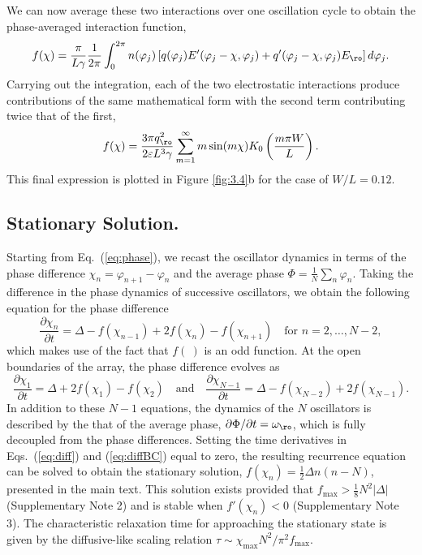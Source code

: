 We can now average these two interactions over one oscillation cycle to obtain the phase-averaged interaction function,
\begin{equation}
    f(\chi) = \frac{\pi}{L\gamma}\frac{1}{2 \pi}\int_0^{2\pi} n(\varphi_j) \left[ q(\varphi_j) E'(\varphi_j-\chi,\varphi_j) + q'(\varphi_j-\chi,\varphi_j) E_{\ro} \right] d\varphi_j.
\end{equation}
Carrying out the integration, each of the two electrostatic interactions produce contributions of the same mathematical form with the second term contributing twice that of the first,
\begin{equation}
     f(\chi) = \frac{3\pi q_{\ro}^2}{2  \varepsilon L^3\gamma} \sum_{m=1}^{\infty} m \sin(m \chi)  K_0\left(\frac{m\pi W}{L}\right).
\end{equation}
This final expression is plotted in Figure \ref{fig:3.4}b for the case of $W/L=0.12$.


\subsection{Stationary Solution.} 
Starting from Eq.~(\ref{eq:phase}), we recast the oscillator dynamics in terms of the phase difference $\chi_n=\varphi_{n+1} - \varphi_n$ and the average phase $\Phi=\tfrac{1}{N}\sum_n\varphi_n$.  Taking the difference in the phase dynamics of successive oscillators, we obtain the following equation for the phase difference 
\begin{equation}
    \frac{\partial \chi_n}{\partial t} = \Delta - f(\chi_{n-1}) + 2 f(\chi_n) - f(\chi_{n+1})\quad\text{for }n=2,\dots,N-2, \label{eq:diff}
\end{equation}
which makes use of the fact that $f(~)$ is an odd function.  At the open boundaries of the array, the phase difference evolves as
\begin{equation}
    \frac{\partial \chi_1}{\partial t} = \Delta + 2f(\chi_1) - f(\chi_2)\quad\text{and}\quad\frac{\partial \chi_{N-1}}{\partial t} = \Delta - f(\chi_{N-2}) + 2f(\chi_{N-1}). \label{eq:diffBC}
\end{equation}
In addition to these $N-1$ equations, the dynamics of the $N$ oscillators is described by the that of the average phase, $\partial \Phi /\partial t = \omega_{\ro}$, which is fully decoupled from the phase differences. Setting the time derivatives in Eqs.~(\ref{eq:diff}) and (\ref{eq:diffBC}) equal to zero, the resulting recurrence equation can be solved to obtain the stationary solution, $f(\chi_n) = \tfrac{1}{2}\Delta n(n-N)$, presented in the main text. This solution exists provided that $f_{\max}>\tfrac{1}{8}N^2\lvert\Delta\rvert$ (Supplementary Note 2) and is stable when $f'(\chi_n)<0$ (Supplementary Note 3). The characteristic relaxation time for approaching the stationary state is given by the diffusive-like scaling relation $\tau\sim \chi_{\max}N^2/\pi^2 f_{\max}$.


